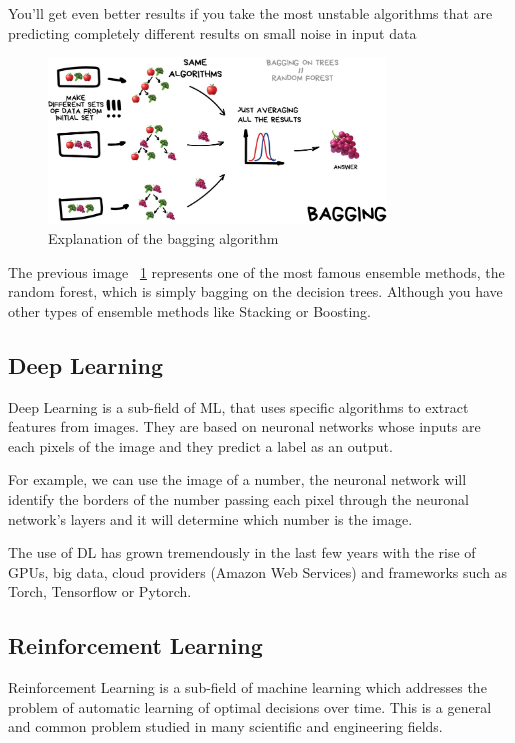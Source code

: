 You'll get even better results if you take the most unstable algorithms that are predicting completely different results on small noise in input data \cite{classical-ml}

\begin{figure}[H]
\centering
\includegraphics[width=0.8\textwidth]{./figures/bagging}
\caption{Explanation of the bagging algorithm \cite{classicalmachinelearning}}
\label{fig:bagging}
\end{figure}


The previous image ~\ref{fig:bagging} represents one of the most famous ensemble methods, the random forest, which is simply bagging on the decision trees. Although you have other types of ensemble methods like Stacking or Boosting.



\subsection[Deep Learning]{Deep Learning}
Deep Learning is a sub-field of ML, that uses specific algorithms to extract features from images. They are based on neuronal networks whose inputs are each pixels of the image and they predict a label as an output.

For example, we can use the image of a number, the neuronal network will identify the borders of the number passing each pixel through the neuronal network's layers and it will determine which number is the image.

The use of DL has grown tremendously in the last few years with the rise of GPUs, big data, cloud providers (Amazon Web Services) and frameworks such as Torch, Tensorflow or Pytorch.

\newpage
\subsection[Reinforcement Learning]{Reinforcement Learning}

Reinforcement Learning is a sub-field of machine learning which addresses
the problem of automatic learning of optimal decisions over time. This is
a general and common problem studied in many scientific and engineering fields.\cite{reinforcement-learning}

